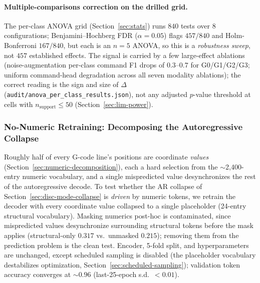 \documentclass[sensors,article,submit,moreauthors,pdftex]{Definitions/mdpi}
\begin{document}
\paragraph{Multiple-comparisons correction on the drilled grid.} The per-class ANOVA grid (Section~\ref{sec:stats}) runs $840$ tests over 8 configurations; Benjamini--Hochberg FDR ($\alpha=0.05$) flags $457 / 840$ and Holm-Bonferroni $167 / 840$, but each is an $n\!=\!5$ ANOVA, so this is a \emph{robustness sweep}, not $457$ established effects. The signal is carried by a few large-effect ablations (noise-augmentation per-class command F1 drops of $0.3$--$0.7$ for G0/G1/G2/G3; uniform command-head degradation across all seven modality ablations); the correct reading is the sign and size of $\Delta$ (\texttt{audit/anova\_per\_class\_results.json}), not any adjusted $p$-value threshold at cells with $n_{\text{support}}\le 50$ (Section~\ref{sec:lim-power}).

\subsubsection{No-Numeric Retraining: Decomposing the Autoregressive Collapse}
\label{sec:abl-nonumeric}

Roughly half of every G-code line's positions are coordinate \emph{values} (Section~\ref{sec:numeric-decomposition}), each a hard selection from the $\sim$2{,}400-entry numeric vocabulary, and a single mispredicted value desynchronizes the rest of the autoregressive decode. To test whether the AR collapse of Section~\ref{sec:disc-mode-collapse} is \emph{driven} by numeric tokens, we retrain the decoder with every coordinate value collapsed to a single placeholder (24-entry structural vocabulary). Masking numerics post-hoc is contaminated, since mispredicted values desynchronize surrounding structural tokens before the mask applies (structural-only $0.317$ vs.\ unmasked $0.215$); removing them from the prediction problem is the clean test. Encoder, 5-fold split, and hyperparameters are unchanged, except scheduled sampling is disabled (the placeholder vocabulary destabilizes optimization, Section~\ref{sec:scheduled-sampling}); validation token accuracy converges at $\sim$$0.96$ (last-25-epoch s.d.\ $<\!0.01$).
\end{document}
